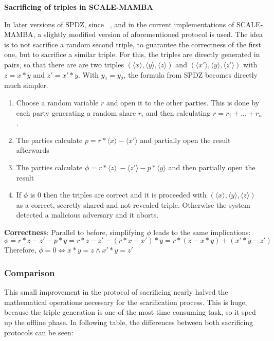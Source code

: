 \documentclass[english,runningheads,a4paper]{llncs}[2018/03/10]
\begin{document}
\textbf{Sacrificing of triples in SCALE-MAMBA}

In later versions of SPDZ, since ~\cite{cryptoeprint:2017:123}, and in the current implementations of SCALE-MAMBA, a slightly modified version of aforementioned protocol is used. The idea is to not sacrifice a random second triple, to guarantee the correctness of the first one, but to sacrifice a similar triple. For this, the triples are directly generated in pairs, so that there are are two triples \( (\langle x \rangle ,\langle y \rangle , \langle z \rangle ) \) and \( (\langle x' \rangle ,\langle y\rangle , \langle z'\rangle ) \) with $z=x*y$ and $z'=x'*y$. With $y_1=y_2$, the formula from SPDZ becomes directly much simpler.
\begin{enumerate}
\item Choose a random variable \( r\) and open it to the other parties. This is done by each party generating a random share \(r_i\) and then calculating \(r=r_1+...+r_n\).
\item The parties calculate  \( p=r*\langle x \rangle - \langle x' \rangle \) and partially open the result afterwards
\item The parties calculate \(\phi = r * \langle z \rangle\ - \langle z' \rangle - p * \langle y \rangle\) and then partially open the result
\item If \( \phi \) is 0 then the triples are correct and it is proceeded with \( (\langle x \rangle ,\langle y\rangle , \langle z\rangle )\) as a correct, secretly shared and not revealed triple. Otherwise the system detected a malicious adversary and it aborts.\\
\end{enumerate}

\textbf{Correctness}: Parallel to before, simplifying \( \phi \) leads to the same implications:\\
$$\phi =r*z-z'-p*y=r*z-z'-(r*x-x')*y=r*(z-x*y)+(x'*y-z')$$
Therefore, \( \phi = 0 \Leftrightarrow x * y = z \land x'*y=z' \)


\subsubsection{Comparison}
This small improvement in the protocol of sacrificing nearly halved the mathematical operations necessary for the scarification process. This is huge, because the triple generation is one of the most time consuming task, so it sped up the offline phase. In following table, the differences between both sacrificing protocols can be seen:
\end{document}
